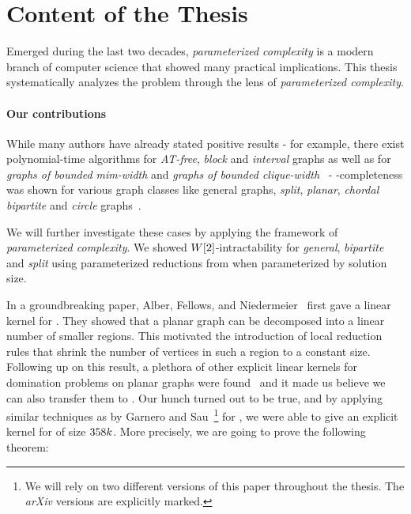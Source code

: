 \section{Content of the Thesis}

Emerged during the last two decades, \textit{parameterized complexity} is a modern branch of computer science that showed many practical implications. 
This thesis systematically analyzes the \sdom problem through the lens of \textit{parameterized complexity}. 

\paragraph{Our contributions}

While many authors have already stated positive results - for example, there exist polynomial-time algorithms for \emph{AT-free}, \emph{block} and \emph{interval} graphs as well as for \emph{graphs of bounded mim-width} and \emph{graphs of bounded clique-width}~\cite{Kloks2021, Galby2020,Courcelle1990,Henning2022,Henning2019} - \NP-completeness was shown for various graph classes like general graphs, \emph{split}, \emph{planar}, \emph{chordal bipartite} and \emph{circle} graphs~\cite{Henning2019, Kloks2021}.


We will further investigate these \NPc cases by applying the framework of \textit{parameterized complexity}. 
We showed $W[2]$-intractability for \textit{general}, \textit{bipartite} and \textit{split} using parameterized reductions from \dom when parameterized by solution size.

In a groundbreaking paper, Alber, Fellows, and Niedermeier~\cite{Alber2004} first gave a linear kernel for \pdom. 
They showed that a planar graph can be decomposed into a linear number of smaller regions. 
This motivated the introduction of local reduction rules that shrink the number of vertices in such a region to a constant size. 
Following up on this result, a plethora of other explicit linear kernels for domination problems on planar graphs were found~\cite{Guo2007, Garnero2017, Luo2013, Alber2006} and it made us believe we can also transfer them to \psdom.
Our hunch turned out to be true, and by applying similar techniques as by Garnero and Sau~\cite{Garnero2018}\footnote{We will rely on two different versions of this paper throughout the thesis. The \textit{arXiv} versions are explicitly marked.} for \ptdom, we were able to give an explicit kernel for \psdom of size $358 k$. 
More precisely, we are going to prove the following theorem:

